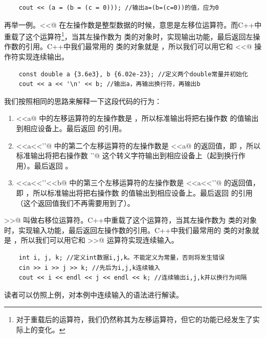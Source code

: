 \begin{lstlisting}
    cout << (a = (b = (c = 0))); //输出a=(b=(c=0))的值，应为0
\end{lstlisting}\par
再举一例。\lstinline@<<@ 在左操作数是整型数据的时候，意思是左移位运算符。而C++中重载了这个运算符\footnote{对于重载后的运算符，我们仍然称其为左移运算符，但它的功能已经发生了实际上的变化。}，当其左操作数为 \lstinline@ostream@ 类的对象时，实现输出功能，最后返回左操作数的引用。C++中我们最常用的 \lstinline@ostream@ 类的对象就是 \lstinline@cout@，所以我们可以用它和 \lstinline@<<@ 操作符实现连续输出。
\begin{lstlisting}
    const double a {3.6e3}, b {6.02e-23}; //定义两个double常量并初始化
    cout << a << '\n' << b; //输出a，再输出换行符，再输出b
\end{lstlisting}
我们按照相同的思路来解释一下这段代码的行为：
\begin{enumerate}
    \item \lstinline@cout<<a@ 中的左移运算符的左操作数是 \lstinline@cout@，所以标准输出将把右操作数 \lstinline@a@ 的值输出到相应设备上。最后返回 \lstinline@cout@ 的引用。
    \item \lstinline@cout<<a<<'\n'@ 中的第二个左移运算符的左操作数是 \lstinline@cout<<a@ 的返回值，即 \lstinline@cout@，所以标准输出将把右操作数 \lstinline@'\n'@ 这个转义字符输出到相应设备上（起到换行作用）。最后返回 。
    \item \lstinline@cout<<a<<'\n'<<b@ 中的第三个左移运算符的左操作数是 \lstinline@cout<<a<<'\n'@ 的返回值，即 \lstinline@cout@，所以标准输出将把右操作数 \lstinline@b@ 的值输出到相应设备上。最后返回 \lstinline@cout@ 的引用（这个返回值我们不再需要用到了）。
\end{enumerate}\par
\lstinline@>>@ 叫做右移位运算符。C++中重载了这个运算符，当其左操作数为 \lstinline@istream@ 类的对象时，实现输入功能，最后返回左操作数的引用。C++中我们最常用的 \lstinline@istream@ 类的对象就是 \lstinline@cin@，所以我们可以用它和 \lstinline@>>@ 运算符实现连续输入。
\begin{lstlisting}
    int i, j, k; //定义int数据i,j,k。不能定义为常量，否则将发生错误
    cin >> i >> j >> k; //先后为i,j,k连续输入
    cout << i << endl << j << endl << k; //连续输出i,j,k并以换行为间隔
\end{lstlisting}
读者可以仿照上例，对本例中连续输入的语法进行解读。\par
